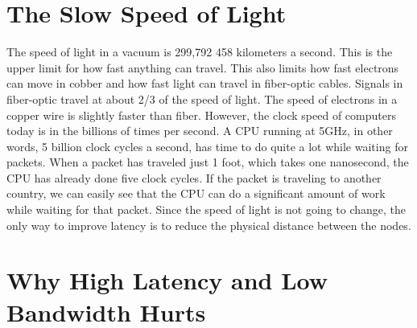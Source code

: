 \section{The Slow Speed of Light}
The speed of light in a vacuum is 299,792 458 kilometers a second. This is the upper limit for how fast anything can travel. This also limits how fast electrons can move in cobber and how fast light can travel in fiber-optic cables. Signals in fiber-optic travel at about 2/3 of the speed of light. The speed of electrons in a copper wire is slightly faster than fiber. However, the clock speed of computers today is in the billions of times per second. A CPU running at 5GHz, in other words, 5 billion clock cycles a second, has time to do quite a lot while waiting for packets. When a packet has traveled just 1 foot, which takes one nanosecond, the CPU has already done five clock cycles. If the packet is traveling to another country, we can easily see that the CPU can do a significant amount of work while waiting for that packet. Since the speed of light is not going to change, the only way to improve latency is to reduce the physical distance between the nodes.






\section{Why High Latency and Low Bandwidth Hurts}


